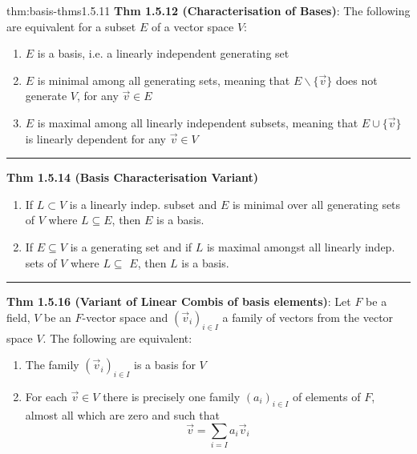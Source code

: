 \documentclass[landscape, 8pt]{extarticle}
\begin{document}
\begin{multicols}{3}
\begin{thm}{thm:basis-thms}{1.5.11}
    \textbf{Thm 1.5.12 (Characterisation of Bases)}: The following are equivalent for a subset $E$ of a vector space $V$:
    \vspace{-5pt}
    \begin{enumerate}
        \setlength\itemsep{0em}
        \item $E$ is a basis, i.e. a linearly independent generating set
        \item $E$ is minimal among all generating sets, meaning that $E \backslash \{\vec{v}\}$ does not generate $V$, for any $\vec{v}\in E$
        \item $E$ is maximal among all linearly independent subsets, meaning that $E \cup \{\vec{v}\}$ is linearly dependent for any $\vec{v}\in V$
    \end{enumerate}

    \vspace{-10pt}
    \noindent\rule{\textwidth}{0.2pt}
    \textbf{Thm 1.5.14 (Basis Characterisation Variant)}
    \vspace{-5pt}
    \begin{enumerate}
        \setlength\itemsep{0em}
        \item If $L \subset V$ is a linearly indep. subset and $E$ is minimal over all generating sets of $V$ where $L \subseteq E$, then $E$ is a basis.
        \item If $E \subseteq V$ is a generating set and if $L$ is maximal amongst all linearly indep. sets of $V$ where $L \subseteq$ $E$, then $L$ is a basis.
    \end{enumerate}

    \noindent\rule{\textwidth}{0.2pt}
    \textbf{Thm 1.5.16 (Variant of Linear Combis of basis elements)}: Let $F$ be a field, $V$ be an $F$-vector space and $(\vec{v}_{i})_{i\in I}$ a family of vectors from the vector space $V$. The following are equivalent:
    \begin{enumerate}
        \setlength\itemsep{0em}
        \item The family $(\vec{v}_{i})_{i\in I}$ is a basis for $V$
        \item For each $\vec{v}\in V$ there is precisely one family $(a_{i})_{i\in I}$ of elements of $F$, almost all which are zero and such that
            \[\vec{v} = \sum_{i = I} a_{i}\vec{v}_{i}\]
    \end{enumerate}

\end{thm}


\end{multicols}
\end{document}
